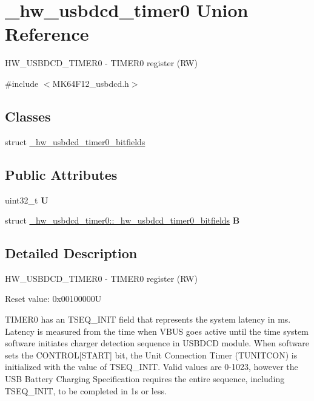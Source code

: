 \hypertarget{union__hw__usbdcd__timer0}{}\section{\+\_\+hw\+\_\+usbdcd\+\_\+timer0 Union Reference}
\label{union__hw__usbdcd__timer0}


H\+W\+\_\+\+U\+S\+B\+D\+C\+D\+\_\+\+T\+I\+M\+E\+R0 -\/ T\+I\+M\+E\+R0 register (RW)  




{\ttfamily \#include $<$M\+K64\+F12\+\_\+usbdcd.\+h$>$}

\subsection*{Classes}
\begin{DoxyCompactItemize}
\item 
struct \hyperlink{struct__hw__usbdcd__timer0_1_1__hw__usbdcd__timer0__bitfields}{\+\_\+hw\+\_\+usbdcd\+\_\+timer0\+\_\+bitfields}
\end{DoxyCompactItemize}
\subsection*{Public Attributes}
\begin{DoxyCompactItemize}
\item 
uint32\+\_\+t {\bfseries U}\hypertarget{union__hw__usbdcd__timer0_ab3e7aa4bd21b1d795701c10626470487}{}\label{union__hw__usbdcd__timer0_ab3e7aa4bd21b1d795701c10626470487}

\item 
struct \hyperlink{struct__hw__usbdcd__timer0_1_1__hw__usbdcd__timer0__bitfields}{\+\_\+hw\+\_\+usbdcd\+\_\+timer0\+::\+\_\+hw\+\_\+usbdcd\+\_\+timer0\+\_\+bitfields} {\bfseries B}\hypertarget{union__hw__usbdcd__timer0_adaf893f6dc179eacfdeef91e9adac36e}{}\label{union__hw__usbdcd__timer0_adaf893f6dc179eacfdeef91e9adac36e}

\end{DoxyCompactItemize}


\subsection{Detailed Description}
H\+W\+\_\+\+U\+S\+B\+D\+C\+D\+\_\+\+T\+I\+M\+E\+R0 -\/ T\+I\+M\+E\+R0 register (RW) 

Reset value\+: 0x00100000U

T\+I\+M\+E\+R0 has an T\+S\+E\+Q\+\_\+\+I\+N\+IT field that represents the system latency in ms. Latency is measured from the time when V\+B\+US goes active until the time system software initiates charger detection sequence in U\+S\+B\+D\+CD module. When software sets the C\+O\+N\+T\+R\+OL\mbox{[}S\+T\+A\+RT\mbox{]} bit, the Unit Connection Timer (T\+U\+N\+I\+T\+C\+ON) is initialized with the value of T\+S\+E\+Q\+\_\+\+I\+N\+IT. Valid values are 0-\/1023, however the U\+SB Battery Charging Specification requires the entire sequence, including T\+S\+E\+Q\+\_\+\+I\+N\+IT, to be completed in 1s or less. 

